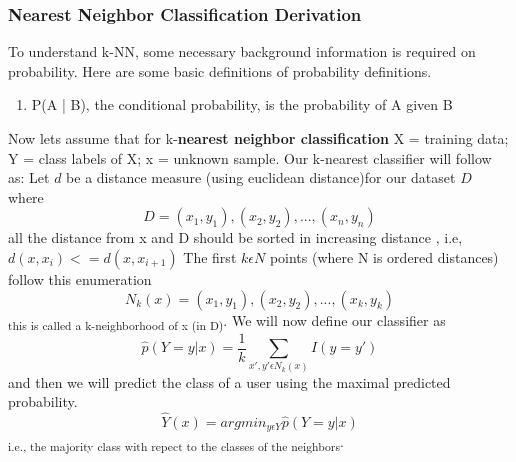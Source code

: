 \documentclass{report}
\begin{document}
\subsubsection{Nearest Neighbor Classification Derivation}
To understand k-NN, some necessary background information is required on probability. Here are some basic definitions of probability definitions. \cite{4}
\begin{enumerate}
	\item P(A | B), the conditional probability, is the probability of A given B
\end{enumerate}
Now lets assume that for  k-\textbf{nearest neighbor classification }  X = training data; Y = class labels of X; x = unknown sample.
Our k-nearest classifier will follow as:
Let $d$ be a distance measure (using euclidean distance)for our dataset $D$ where
\begin{equation}
D = (x_{1}, y_{1}), (x_{2}, y_{2}), ... , (x_{n}, y_{n})
\end{equation}
all the distance from x and D should be sorted in increasing distance , i.e,
$d(x,x_{i}) <= d(x,x_{i+1})$ \newline
The first $k \epsilon N$ points (where N is ordered distances) follow this  enumeration 
\begin{equation}
N_{k}(x) = (x_{1}, y_{1}), (x_{2}, y_{2}), ... , (x_{k}, y_{k}) 
\end{equation} 
\textsubscript{this is called a k-neighborhood of x (in D)}. \newline\newline
We will now define our classifier as 
\begin{equation}
\hat{p}(Y = y | x) = \frac{1}{k} \sum_{x',y' \epsilon N_{k}(x) }  I(y = y')
\end{equation}
and then we will predict the class of a user using the maximal predicted probability.
\begin{equation}
\hat{Y}(x) = argmin_{y \epsilon Y} \hat{p}(Y = y |x)
\end{equation}
\textsubscript{i.e., the majority class with repect to the classes of the neighbors}. \newline\newline
\end{document}
